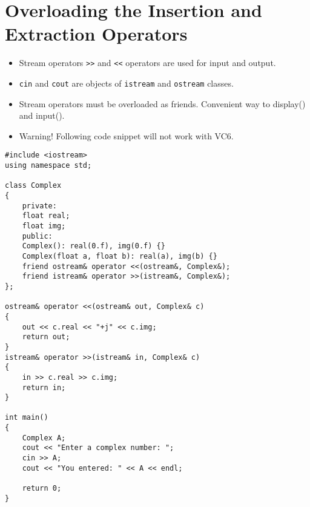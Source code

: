 \documentclass[12pt,a4paper]{article}
\begin{document}
\section{Overloading the Insertion and Extraction Operators}
\begin{itemize}
\item Stream operators \verb|>>| and \verb|<<| operators are used for input and output.
\item \verb|cin| and \verb|cout| are objects of \verb|istream| and \verb|ostream| classes.
\item Stream operators must be overloaded as friends. Convenient way to display() and input().
\item Warning! Following code snippet will not work with VC6.
\end{itemize}
\begin{lstlisting}[caption={Overloading Stream Operators for Complex class}]
#include <iostream>
using namespace std;

class Complex
{
	private:
	float real;
	float img;
	public:
	Complex(): real(0.f), img(0.f) {}
	Complex(float a, float b): real(a), img(b) {}
	friend ostream& operator <<(ostream&, Complex&);
	friend istream& operator >>(istream&, Complex&);
};

ostream& operator <<(ostream& out, Complex& c)
{
	out << c.real << "+j" << c.img;
	return out;
}
istream& operator >>(istream& in, Complex& c)
{
	in >> c.real >> c.img;
	return in;
}

int main()
{
	Complex A;
	cout << "Enter a complex number: ";
	cin >> A;
	cout << "You entered: " << A << endl;

	return 0;
}
\end{lstlisting}
\end{document}
